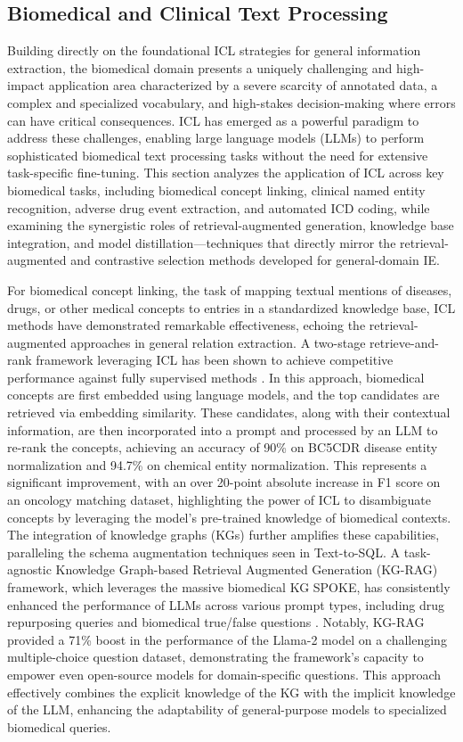 \documentclass[11pt]{article}
\begin{document}
\subsection{Biomedical and Clinical Text Processing}

Building directly on the foundational ICL strategies for general information extraction, the biomedical domain presents a uniquely challenging and high-impact application area characterized by a severe scarcity of annotated data, a complex and specialized vocabulary, and high-stakes decision-making where errors can have critical consequences. ICL has emerged as a powerful paradigm to address these challenges, enabling large language models (LLMs) to perform sophisticated biomedical text processing tasks without the need for extensive task-specific fine-tuning. This section analyzes the application of ICL across key biomedical tasks, including biomedical concept linking, clinical named entity recognition, adverse drug event extraction, and automated ICD coding, while examining the synergistic roles of retrieval-augmented generation, knowledge base integration, and model distillation---techniques that directly mirror the retrieval-augmented and contrastive selection methods developed for general-domain IE.

For biomedical concept linking, the task of mapping textual mentions of diseases, drugs, or other medical concepts to entries in a standardized knowledge base, ICL methods have demonstrated remarkable effectiveness, echoing the retrieval-augmented approaches in general relation extraction. A two-stage retrieve-and-rank framework leveraging ICL has been shown to achieve competitive performance against fully supervised methods \cite{ref511}. In this approach, biomedical concepts are first embedded using language models, and the top candidates are retrieved via embedding similarity. These candidates, along with their contextual information, are then incorporated into a prompt and processed by an LLM to re-rank the concepts, achieving an accuracy of 90\% on BC5CDR disease entity normalization and 94.7\% on chemical entity normalization. This represents a significant improvement, with an over 20-point absolute increase in F1 score on an oncology matching dataset, highlighting the power of ICL to disambiguate concepts by leveraging the model's pre-trained knowledge of biomedical contexts. The integration of knowledge graphs (KGs) further amplifies these capabilities, paralleling the schema augmentation techniques seen in Text-to-SQL. A task-agnostic Knowledge Graph-based Retrieval Augmented Generation (KG-RAG) framework, which leverages the massive biomedical KG SPOKE, has consistently enhanced the performance of LLMs across various prompt types, including drug repurposing queries and biomedical true/false questions \cite{ref512}. Notably, KG-RAG provided a 71\% boost in the performance of the Llama-2 model on a challenging multiple-choice question dataset, demonstrating the framework's capacity to empower even open-source models for domain-specific questions. This approach effectively combines the explicit knowledge of the KG with the implicit knowledge of the LLM, enhancing the adaptability of general-purpose models to specialized biomedical queries.
\end{document}
